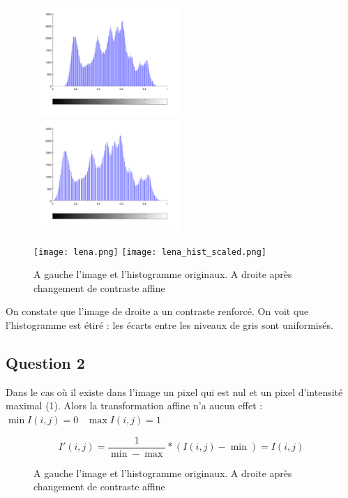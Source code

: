 \documentclass{article}
\begin{document}
\begin{figure}[h]

	\includegraphics[width=0.5\textwidth]{hist_orig.png}
	\includegraphics[width=0.5\textwidth]{hist_scaled.png}

\centering
	\texttt{[image: lena.png]}
	\texttt{[image: lena\_hist\_scaled.png]}
		
	\caption{A gauche l'image et l'histogramme originaux. A droite après changement de contraste affine}
	
\end{figure}

On constate que l'image de droite a un contraste renforcé. On voit que l'histogramme est étiré : les écarts entre les niveaux de gris sont uniformisés.  

\subsection*{Question 2}

Dans le cas où il existe dans l'image un pixel qui est nul et un pixel d'intensité maximal (1). Alors la transformation affine n'a aucun effet : $\min I(i,j) = 0 \;\;\; \max I(i,j) = 1$
	
$$I'(i,j) = \frac{1}{\min-\max} * (I(i,j) -\min) = I(i,j)$$


\begin{figure}[h]
		
	\caption{A gauche l'image et l'histogramme originaux. A droite après changement de contraste affine}
	
\end{figure}
\end{document}
